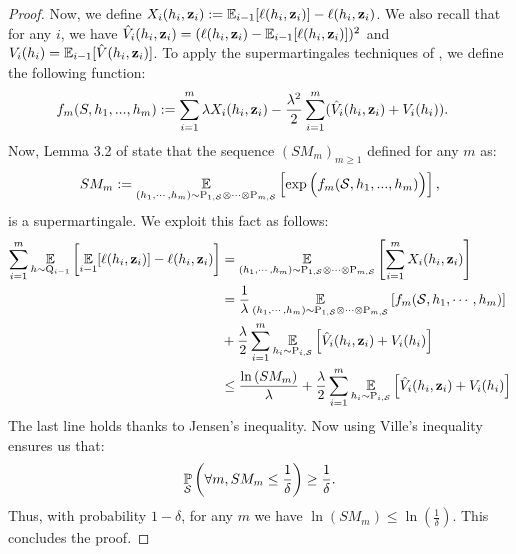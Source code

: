 \begin{noaddcontents}
\begin{proof}
    Now, we define $X_i(h_i,\mathbf{z}_i):= \operatorname*{\mathbb{E}}_{i-1}[\ell(h_i,\mathbf{z}_i)]- \ell(h_i, \mathbf{z}_i)$. We also recall that for any $i$, we have $\hat{V}_i(h_i,\mathbf{z}_i)= (\ell(h_i,\mathbf{z}_i)-\operatorname*{\mathbb{E}}_{i-1}[\ell(h_i,\mathbf{z}_i)])^2$ and $V_i(h_i)= \operatorname*{\mathbb{E}}_{i-1}[\hat{V}(h_i,\mathbf{z}_i)]$.
    To apply the supermartingales techniques of \cite{haddouche2023pac}, we define the following function:
    \begin{align*}
       f_m(S,h_1,...,h_m) & := \sum_{i=1}^m \lambda X_i(h_i,\mathbf{z}_i)  - \frac{\lambda^2}{2}\sum_{i=1}^m(\hat{V}_i(h_i,\mathbf{z}_i) + V_i(h_i)).
       \end{align*}
        Now, Lemma 3.2 of \cite{haddouche2023pac} state that the sequence $(SM_m)_{m\geq 1}$ defined for any $m$ as:
        \begin{align*}
         SM_m := \operatorname*{\mathbb{E}}_{(h_1,\cdots,h_m) \sim \mathrm{P}_{1,\mathcal{S}} \otimes \cdots \otimes \mathrm{P}_{m,\mathcal{S}}} \left[ \exp \Big( f_m(\mathcal{S},h_1,...,h_m) \Big)  \right],
         \end{align*}
        is a supermartingale. 
        We exploit this fact as follows: 
        \begin{align*}
            \sum_{i=1}^{m}\operatorname*{\mathbb{E}}_{h\sim\mathrm{Q}_{i-1}}\left[\operatorname*{\mathbb{E}}_{i-1}[\ell(h_i,\mathbf{z}_i)]-\ell(h_i, \mathbf{z}_i)\right] &= \operatorname*{\mathbb{E}}_{(h_1,\cdots,h_m) \sim \mathrm{P}_{1,\mathcal{S}} \otimes \cdots \otimes \mathrm{P}_{m,\mathcal{S}}} \left[\sum_{i=1}^m X_i(h_i,\mathbf{z}_i)\right] \\
            & = \frac{1}{\lambda}\operatorname*{\mathbb{E}}_{(h_1,\cdots,h_m) \sim \mathrm{P}_{1,\mathcal{S}} \otimes \cdots \otimes \mathrm{P}_{m,\mathcal{S}}} \left[ f_m (\mathcal{S},h_1,\cdots,h_m)\right] \\
            & + \frac{\lambda}{2} \sum_{i=1}^m \operatorname*{\mathbb{E}}_{h_i\sim \mathrm{P}_{i,\mathcal{S}}}\left[ \hat{V}_i(h_i,\mathbf{z}_i) + V_i(h_i) \right] \\
            & \leq \frac{\ln\left( SM_m \right)}{\lambda} + \frac{\lambda}{2} \sum_{i=1}^m \operatorname*{\mathbb{E}}_{h_i\sim \mathrm{P}_{i,\mathcal{S}}}\left[ \hat{V}_i(h_i,\mathbf{z}_i) + V_i(h_i) \right]
        \end{align*}
        The last line holds thanks to Jensen's inequality.
        Now using Ville's inequality ensures us that:
        \begin{align*}
        \operatorname*{\mathbb{P}}_{\mathcal{S}}\left( \forall m, SM_m \leq \frac{1}{\delta} \right) \geq \frac{1}{\delta}.
        \end{align*}
        Thus, with probability $1-\delta$, for any $m$ we have $\ln\left( SM_m \right) \leq \ln\left( \frac{1}{\delta} \right)$.
        This concludes the proof.
    \end{proof}
    

\end{noaddcontents}
